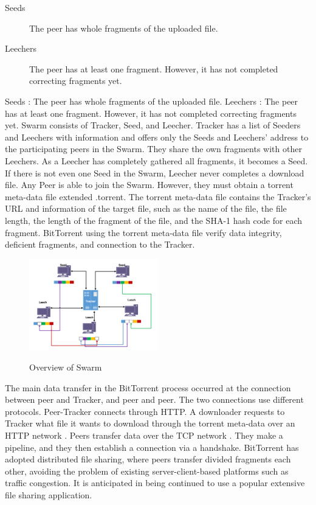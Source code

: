 \begin{description}
	\item[Seeds] The peer has whole fragments of the uploaded file.
	\item[Leechers] The peer has at least one fragment. However, it has not completed correcting fragments yet.
\end{description}
	Seeds : The peer has whole fragments of the uploaded file.
	Leechers : The peer has at least one fragment. However, it has not completed correcting fragments yet.
Swarm consists of Tracker, Seed, and Leecher. Tracker has a list of Seeders and Leechers with information and offers only the Seeds and Leechers' address to the participating peers in the Swarm. They share the own fragments with other Leechers. As a Leecher has completely gathered all fragments, it becomes a Seed. If there is not even one Seed in the Swarm, Leecher never completes a download file. Any Peer is able to join the Swarm. However, they must obtain a torrent meta-data file extended .torrent. The torrent meta-data file contains the Tracker's URL and information of the target file, such as the name of the file, the file length, the length of the fragment of the file, and the SHA-1 hash code for each fragment. BitTorrent using the torrent meta-data file verify data integrity, deficient fragments, and connection to the Tracker. 

\begin{figure}[!ht]
	\centering
	\includegraphics[width=0.5\textwidth]{images/fig_2_1.pdf}\\
	\caption{Overview of Swarm}
	\label{fig:Swarm}
\end{figure}

The main data transfer in the BitTorrent process occurred at the connection between peer and Tracker, and peer and peer. The two connections use different protocols. Peer-Tracker connects through HTTP. A downloader requests to Tracker what file it wants to download through the torrent meta-data over an HTTP network \cite{chokkalingam2004bittorrent}. Peers transfer data over the TCP network \cite{chokkalingam2004bittorrent}. They make a pipeline, and they then establish a connection via a handshake. BitTorrent has adopted distributed file sharing, where peers transfer divided fragments each other,  avoiding the problem of existing server-client-based platforms such as traffic congestion. It is anticipated in being continued to use a popular extensive file sharing application.

